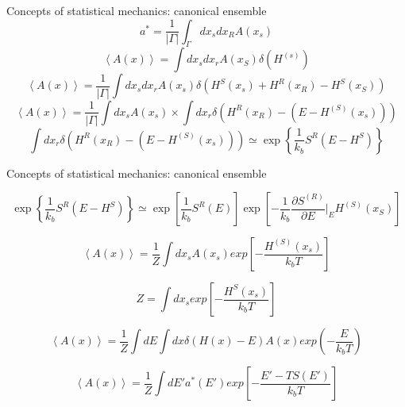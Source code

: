 \documentclass{beamer}
\begin{document}
\begin{frame}{Concepts of statistical mechanics: canonical ensemble}
\begin{equation}
a^{*}=\frac{1}{|\Gamma|}\int_{\Gamma}dx_{s}dx_{R} A(x_{s})
\end{equation}
\begin{equation}
\left\langle A(x) \right\rangle=\int dx_{s}dx_{r}A(x_{S})\delta(H^{(s)})
\end{equation}
\begin{equation}
\left\langle A(x) \right\rangle=\frac{1}{|\Gamma|}\int dx_{s}dx_{r}A(x_{s})\delta(H^{S}(x_{s})+H^{R}(x_{R})-H^{S}(x_{S}))
\end{equation}
\begin{equation}
\left\langle A(x) \right\rangle=\frac{1}{|\Gamma|}\int  dx_{s}A(x_{s})\times\int dx_{r}\delta(H^{R}(x_{R})-(E-H^{(S)}(x_{s})))
\end{equation}
\begin{equation}
\int dx_{r}\delta(H^{R}(x_{R})-(E-H^{(S)}(x_{s})))\simeq \exp\left\lbrace\frac{1}{k_{b}} S^{R}(E-H^{S})\right\rbrace
\end{equation}


\end{frame}

\begin{frame}{Concepts of statistical mechanics: canonical ensemble}

\begin{equation}
\exp\left\lbrace\frac{1}{k_{b}} S^{R}(E-H^{S})\right\rbrace \simeq  \exp \left[ \frac{1}{k_{b}}S^{R}(E)      \right] \exp\left[  -\frac{1}{k_{b}}\frac{\partial S^{(R)}}{\partial E}|_{E}  H^{(S)}(x_{S})  \right]
\end{equation}

\begin{equation}
\left\langle A(x) \right\rangle=\dfrac{1}{Z}\int dx_{s}A(x_{s})exp\left[ -\frac{H^{(S)}(x_{s})}{k_{b}T} \right]
\end{equation}

\begin{equation}
Z=\int dx_{s}exp\left[  -\frac{H^{S}(x_{s})}{k_{b}T}  \right]
\end{equation}


\begin{equation}
\left\langle A(x) \right\rangle=\dfrac{1}{Z}\int dE\int dx\delta(H(x)-E)A(x)exp(-\dfrac{E}{k_{b}T})
\end{equation}

\begin{equation}
\left\langle A(x) \right\rangle=\dfrac{1}{Z}\int dE'a^{*}(E')exp\left[ - \dfrac{E'-TS(E')}{k_{b}T}\right]
\end{equation}


\end{frame}
\end{document}

